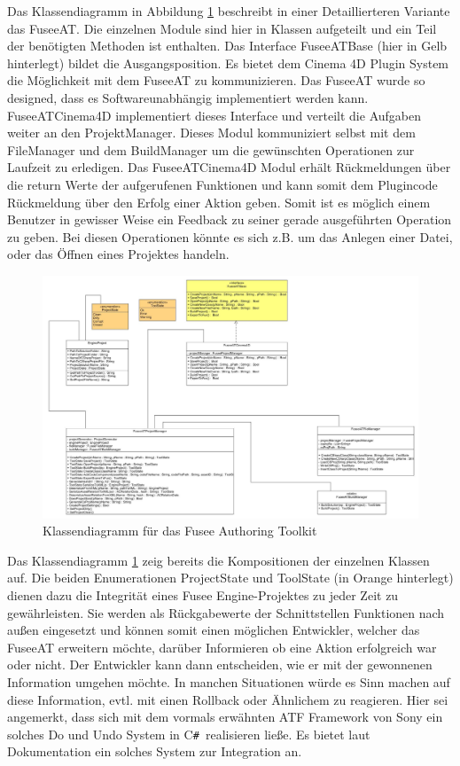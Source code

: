 \documentclass[pagesize, paper=a4, fontsize=12pt, titlepage=true, headings=small, headnosepline, abstractoff, liststotoc, nochapterprefix, plainheadsepline, twoside]{scrreprt}
\newcommand{\CSS}{C\texttt{\# }}
\begin{document}
Das Klassendiagramm in Abbildung \ref{FuseeATKlassendiagramm} beschreibt in einer Detaillierteren Variante das FuseeAT. Die einzelnen Module sind hier in Klassen aufgeteilt und ein Teil der benötigten Methoden ist enthalten. Das Interface FuseeATBase (hier in Gelb hinterlegt) bildet die Ausgangsposition. Es bietet dem Cinema 4D Plugin System die Möglichkeit mit dem FuseeAT zu kommunizieren. Das FuseeAT wurde so designed, dass es Softwareunabhängig implementiert werden kann. FuseeATCinema4D implementiert dieses Interface und verteilt die Aufgaben weiter an den ProjektManager. Dieses Modul kommuniziert selbst mit dem FileManager und dem BuildManager um die gewünschten Operationen zur Laufzeit zu erledigen. Das FuseeATCinema4D Modul erhält Rückmeldungen über die return Werte der aufgerufenen Funktionen und kann somit dem Plugincode Rückmeldung über den Erfolg einer Aktion geben. Somit ist es möglich einem Benutzer in gewisser Weise ein Feedback zu seiner gerade ausgeführten Operation zu geben. Bei diesen Operationen könnte es sich z.B. um das Anlegen einer Datei, oder das Öffnen eines Projektes handeln.
\begin{figure}[ht]
	\centering
	\includegraphics[width=\linewidth]{Bilder/Klassendiagramm_FuseeAT.jpg}
	\caption{Klassendiagramm für das Fusee Authoring Toolkit}
	\label{FuseeATKlassendiagramm}
\end{figure}
Das Klassendiagramm \ref{FuseeATKlassendiagramm} zeig bereits die Kompositionen der einzelnen Klassen auf. Die beiden Enumerationen ProjectState und ToolState (in Orange hinterlegt) dienen dazu die Integrität eines Fusee Engine-Projektes zu jeder Zeit zu gewährleisten. Sie werden als Rückgabewerte der Schnittstellen Funktionen nach außen eingesetzt und können somit einen möglichen Entwickler, welcher das FuseeAT erweitern möchte, darüber Informieren ob eine Aktion erfolgreich war oder nicht. Der Entwickler kann dann entscheiden, wie er mit der gewonnenen Information umgehen möchte. In manchen Situationen würde es Sinn machen auf diese Information, evtl. mit einen Rollback oder Ähnlichem zu reagieren. Hier sei angemerkt, dass sich mit dem vormals erwähnten ATF Framework von Sony ein solches Do und Undo System in \CSS realisieren ließe. Es bietet laut Dokumentation ein solches System zur Integration an.
\end{document}
